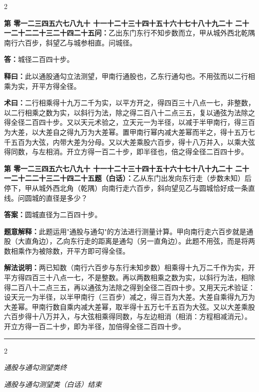 \documentclass[10pt,a4paper]{article}
\newcommand{\longline}{\noindent\rule{\textwidth}{0.4pt}}
\newcounter{probnum}
\newcounter{probnumvol}[section]
\newcommand{\chnum}[1]{%
  \ifcase#1 零\or 一\or 二\or 三\or 四\or 五\or 六\or 七\or 八\or 九\or 十\or
    十一\or 十二\or 十三\or 十四\or 十五\or 十六\or 十七\or 十八\or 十九\or 二十\or
    二十一\or 二十二\or 二十三\or 二十四\or 二十五\fi}
\newcommand{\problemclassical}[1]{%
  \stepcounter{probnumvol}%
  \par\noindent
  \textcolor{classicalcolor}{\textbf{第\chnum{\value{probnumvol}}问：}}#1\par\smallskip
}
\newcommand{\problemmodern}[1]{%
  \par\noindent
  \textcolor{moderncolor}{\textbf{第\chnum{\value{probnumvol}}题（白话）：}}#1\par\smallskip
}
\newcommand{\answerclassical}[1]{%
  \par\noindent\textcolor{classicalcolor}{\textbf{答：}}#1\par
}
\newcommand{\answermodern}[1]{%
  \par\noindent\textcolor{moderncolor}{\textbf{答案：}}#1\par
}
\newcommand{\shiyiclassical}[1]{%
  \par\noindent\textcolor{classicalcolor}{\textbf{释曰：}}#1\par
}
\newcommand{\shiyimodern}[1]{%
  \par\noindent\textcolor{moderncolor}{\textbf{题意解释：}}#1\par
}
\newcommand{\shuyueclassical}[1]{%
  \par\noindent\textcolor{classicalcolor}{\textbf{术曰：}}#1\par
}
\newcommand{\shuyuemodern}[1]{%
  \par\noindent\textcolor{moderncolor}{\textbf{解法说明：}}#1\par
}
\newcommand{\endclassical}[1]{%
  \vspace{0.3cm}
  \begin{center}\textit{#1}\end{center}
}
\newcommand{\endmodern}[1]{%
  \vspace{0.3cm}
  \begin{center}\textit{#1}\end{center}
}
\begin{document}
\begin{paracol}{2}

\problemclassical{乙出东门东行不知步数而立，甲从城外西北乾隅南行六百步，斜望乙与城参相直。问城径。}

\answerclassical{城径二百四十步。}

\shiyiclassical{此以通股通勾立法测望，甲南行通股也，乙东行通勾也。不用弦而以二行相乘为实，开平方得全径。}

\shuyueclassical{二行相乘得十九万二千为实，以平方开之，得四百三十八点一七，非整数，以二行相乘之数为实，以斜行为法，除之得二百八十二点三五，复以通弦为法除之得全径二百四十步。又以天元术验之，立天元一为半径，以减于半甲南行，得三百为大差，以大差自之得九万为大差幂。置甲南行幂内减大差幂而半之，得十五万七千五百为大弦，内带大差为分母。又以大差乘股六百步，得十八万并入，以乘大弦得同数，与左相消。开立方得一百二十步，即半径也，倍之得全径二百四十步。}

\switchcolumn

\problemmodern{乙从东门出发向东行走（步数未知）后停下，甲从城外西北角（乾隅）向南行走六百步，斜向望见乙与圆城恰好成一条直线。问圆城的直径是多少？}

\answermodern{圆城直径为二百四十步。}

\shiyimodern{此题运用"通股与通勾"的方法进行测量计算。甲向南行走六百步就是通股（大直角边），乙向东行走的距离是通勾（另一直角边）。此题不用弦，而是将两数相乘作为被除数，开平方即可得全径。}

\shuyuemodern{两已知数（南行六百步与东行未知步数）相乘得十九万二千作为实，开平方得四百三十八点一七，不是整数。再以两数相乘之数为实，以斜行为法，相除得二百八十二点三五，再以通弦为法除之得到全径二百四十步。又用天元术验证：设天元一为半径，以半甲南行（三百步）减之，得三百为大差。大差自乘得九万为大差幂。甲南行数自乘内减大差幂，取半得十五万七千五百为大弦。又以大差乘股六百步得十八万并入，与大弦相乘得同数，与左边相消（相消：方程相减消元）。开立方得一百二十步，即为半径，加倍得全径二百四十步。}

\end{paracol}

\vspace{0.5cm}
\longline
\begin{paracol}{2}
\endclassical{通股与通勾测望类终}
\switchcolumn
\endmodern{通股与通勾测望类（白话）结束}
\end{paracol}

\newpage

\setcounter{probnumvol}{0}
\end{document}

